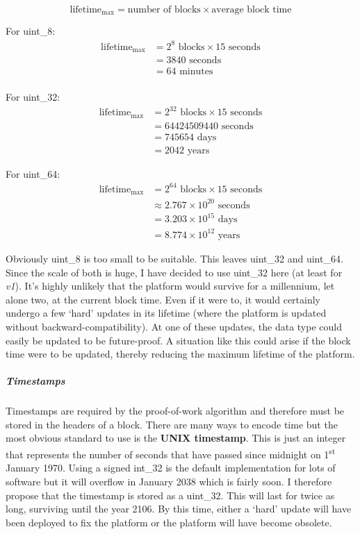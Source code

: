 \documentclass{article}
\begin{document}
\[\textrm{lifetime}_\textrm{max} = \textrm{number of blocks} \times \textrm{average block time}\]

For uint\_8:
\begin{align*}
    \textrm{lifetime}_\textrm{max} &= 2^{8} \textrm{ blocks} \times 15 \textrm{ seconds} \\
    &= 3840 \textrm{ seconds} \\
    &= 64 \textrm{ minutes} \\
\end{align*}

For uint\_32:
\begin{align*}
    \textrm{lifetime}_\textrm{max} &= 2^{32} \textrm{ blocks} \times 15 \textrm{ seconds} \\
    &= 64424509440 \textrm{ seconds} \\
    &= 745654 \textrm{ days} \\
    &= 2042 \textrm{ years}
\end{align*}

For uint\_64:
\begin{align*}
    \textrm{lifetime}_\textrm{max} &= 2^{64} \textrm{ blocks} \times 15 \textrm{ seconds} \\
    &\approx 2.767 \times 10^{20} \textrm{ seconds} \\
    &= 3.203{\times}10^{15} \textrm{ days} \\
    &= 8.774{\times}10^{12} \textrm{ years}
\end{align*}

Obviously uint\_8 is too small to be suitable. This leaves uint\_32 and uint\_64. Since the scale of both is huge, I have decided to use uint\_32 here (at least for \textit{v1}). It's highly unlikely that the platform would survive for a millennium, let alone two, at the current block time. Even if it were to, it would certainly undergo a few `hard' updates in its lifetime (where the platform is updated without backward-compatibility). At one of these updates, the data type could easily be updated to be future-proof. A situation like this could arise if the block time were to be updated, thereby reducing the maximum lifetime of the platform.

\subparagraph{Timestamps}
Timestamps are required by the proof-of-work algorithm and therefore must be stored in the headers of a block. There are many ways to encode time but the most obvious standard to use is the \textbf{UNIX timestamp}. This is just an integer that represents the number of seconds that have passed since midnight on 1\textsuperscript{st} January 1970. Using a signed int\_32 is the default implementation for lots of software but it will overflow in January 2038 which is fairly soon. I therefore propose that the timestamp is stored as a uint\_32. This will last for twice as long, surviving until the year 2106. By this time, either a `hard' update will have been deployed to fix the platform or the platform will have become obsolete.
\end{document}
